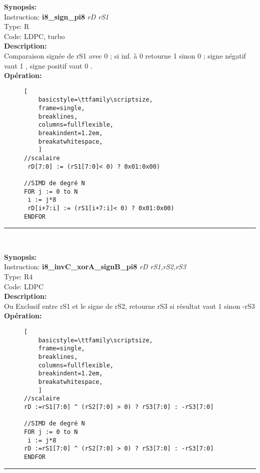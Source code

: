 {\scriptsize
\textbf{Synopsis:}\\
Instruction: \textbf{i8\_sign\_pi8 } \textit{rD rS1}\\
Type: R\\
Code: LDPC, turbo\\
\textbf{Description:}\\
Comparaison signée de rS1 avec 0 ; si inf. à 0 retourne 1 sinon 0 ; signe négatif vaut 1 , signe positif vaut 0 . \\
\textbf{Opération:}\\
    \begin{figure}[H]
    \begin{lstlisting}[
    basicstyle=\ttfamily\scriptsize,
    frame=single,
    breaklines,
    columns=fullflexible,
    breakindent=1.2em,
    breakatwhitespace,
    ]
//scalaire
 rD[7:0] := (rS1[7:0]< 0) ? 0x01:0x00) 
    
//SIMD de degré N
FOR j := 0 to N    
 i := j*8    
 rD[i+7:i] := (rS1[i+7:i]< 0) ? 0x01:0x00) 
ENDFOR
\end{lstlisting}
\end{figure}
}
\rule{8cm}{0.4pt}\\
{\scriptsize
\textbf{Synopsis:}\\
Instruction: \textbf{i8\_invC\_xorA\_signB\_pi8 } \textit{rD rS1,rS2,rS3}\\
Type: R4\\
Code: LDPC\\
\textbf{Description:}\\
Ou Exclusif entre rS1 et le signe de rS2, retourne rS3 si résultat vaut 1 sinon -rS3\\
\textbf{Opération:}\\
    \begin{figure}[H]
    \begin{lstlisting}[
    basicstyle=\ttfamily\scriptsize,
    frame=single,
    breaklines,
    columns=fullflexible,
    breakindent=1.2em,
    breakatwhitespace,
    ]
//scalaire
rD :=rS1[7:0] ^ (rS2[7:0] > 0) ? rS3[7:0] : -rS3[7:0]
    
//SIMD de degré N
FOR j := 0 to N    
 i := j*8    
rD :=rS1[7:0] ^ (rS2[7:0] > 0) ? rS3[7:0] : -rS3[7:0]
ENDFOR
\end{lstlisting}
\end{figure}
}
\rule{8cm}{0.4pt}\\
